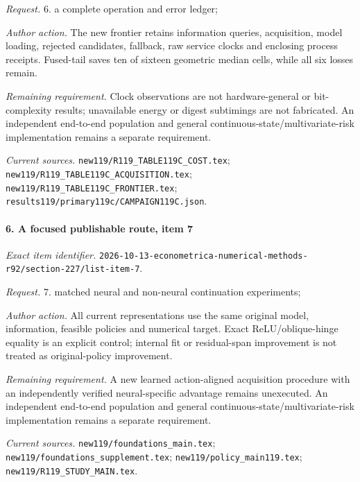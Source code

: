 \par\emph{Request.} 6. a complete operation and error ledger;

\par\emph{Author action.} The new frontier retains information queries, acquisition, model loading, rejected candidates, fallback, raw service clocks and enclosing process receipts. Fused-tail saves ten of sixteen geometric median cells, while all six losses remain.

\par\emph{Remaining requirement.} Clock observations are not hardware-general or bit-complexity results; unavailable energy or digest subtimings are not fabricated. An independent end-to-end population and general continuous-state/\allowbreak{}multivariate-risk implementation remains a separate requirement.

\par\emph{Current sources.} \nolinkurl{new119/R119_TABLE119C_COST.tex}; \nolinkurl{new119/R119_TABLE119C_ACQUISITION.tex}; \nolinkurl{new119/R119_TABLE119C_FRONTIER.tex}; \nolinkurl{results119/primary119c/CAMPAIGN119C.json}.

\paragraph{6. A focused publishable route, item 7}

\emph{Exact item identifier.} \nolinkurl{2026-10-13-econometrica-numerical-methods-r92/section-227/list-item-7}.

\par\emph{Request.} 7. matched neural and non-neural continuation experiments;

\par\emph{Author action.} All current representations use the same original model, information, feasible policies and numerical target. Exact ReLU/\allowbreak{}oblique-hinge equality is an explicit control; internal fit or residual-span improvement is not treated as original-policy improvement.

\par\emph{Remaining requirement.} A new learned action-aligned acquisition procedure with an independently verified neural-specific advantage remains unexecuted. An independent end-to-end population and general continuous-state/\allowbreak{}multivariate-risk implementation remains a separate requirement.

\par\emph{Current sources.} \nolinkurl{new119/foundations_main.tex}; \nolinkurl{new119/foundations_supplement.tex}; \nolinkurl{new119/policy_main119.tex}; \nolinkurl{new119/R119_STUDY_MAIN.tex}.

